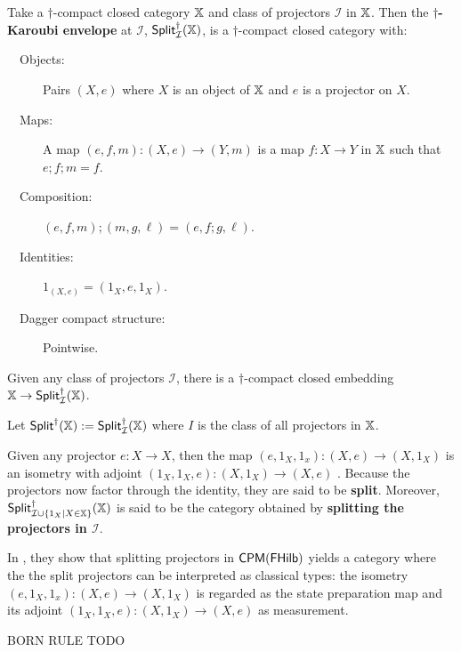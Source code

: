 \begin{definition}{\cite{idempotent}}
Take a $\dag$-compact closed category $\mathbb{X}$ and class of projectors $\mathcal I$ in $\mathbb{X}$.  Then the {\bf $\dag$-Karoubi envelope} at $\mathcal I$, ${\sf Split}_{\mathcal I}^{\dag}(\mathbb{X})$, is a $\dag$-compact closed category with:
\begin{description}
\item[\ \ Objects:] Pairs $(X,e)$ where $X$ is an object of $\mathbb{X}$ and $e$ is a projector on $X$.
\item[\ \ Maps:] A map $(e,f,m):(X,e)\to (Y,m)$ is a map $f:X\to Y$ in $\mathbb{X}$ such that $e;f;m=f$.
\item[\ \ Composition:] $(e,f,m);(m,g,\ell) = (e,f;g,\ell)$.
\item[\ \ Identities:] $1_{(X,e)}=(1_X,e,1_X)$.
\item[\ \ Dagger compact structure:] Pointwise.
\end{description}



Given any class of projectors $\mathcal I$, there is a $\dag$-compact closed embedding 
$\mathbb{X}\to{\sf Split}_{\mathcal I}^{\dag}(\mathbb{X})$.

Let ${\sf Split}^{\dag}(\mathbb{X}):={\sf Split}_{\mathcal I}^{\dag}(\mathbb{X})$ where $I$ is the class of all projectors in $\mathbb{X}$.
\end{definition}

Given  any projector $e:X\to X$, then the map $(e,1_X, 1_x) :(X,e)\to (X,1_X)$ is an isometry with adjoint $(1_X,1_X, e) :(X,1_X)\to (X,e)$ .
Because the projectors now factor through the identity, they are said to be {\bf split}. Moreover, 
${\sf Split}_{{\mathcal I }\cup \{ 1_X | X \in \mathbb{X}\}}^{\dag}(\mathbb{X})$ is said to be the category obtained by {\bf splitting the projectors in $\mathcal I$}.



\begin{remark}
In \cite{idempotent}, they show that splitting projectors in $\mathsf{CPM}(\mathsf{FHilb})$ yields a category where the the split projectors can be interpreted as classical types: the isometry  $(e,1_X, 1_x) :(X,e)\to (X,1_X)$ is regarded as the state preparation map and its adjoint $(1_X,1_X, e) :(X,1_X)\to (X,e)$  as measurement.
\end{remark}



BORN RULE TODO 

